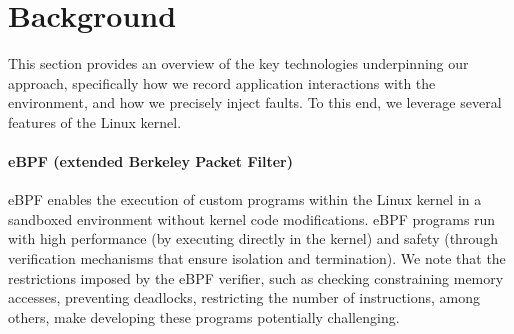 \section{Background}
This section provides an overview of the key technologies underpinning our approach, specifically how we record application interactions with the environment, and how we precisely inject faults. To this end, we leverage several features of the Linux kernel.





\paragraph{eBPF (extended Berkeley Packet Filter)} eBPF enables the execution of custom programs within the Linux kernel in a sandboxed environment without kernel code modifications.
eBPF programs run with high performance (by executing directly in the kernel) and safety (through verification mechanisms that ensure isolation and termination).
We note that the restrictions imposed by the eBPF verifier, such as checking constraining memory accesses, preventing deadlocks, restricting the number of instructions, among others, make developing these programs potentially challenging.


